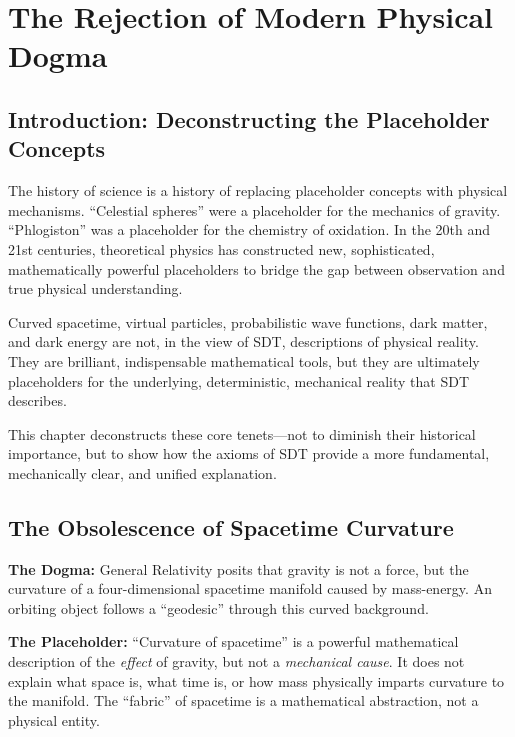 \chapter{The Rejection of Modern Physical Dogma}

\author{James Tyndall}

\section{Introduction: Deconstructing the Placeholder Concepts}

The history of science is a history of replacing placeholder concepts with physical mechanisms.  ``Celestial spheres'' were a placeholder for the mechanics of gravity.  ``Phlogiston'' was a placeholder for the chemistry of oxidation.  In the 20th and 21st centuries, theoretical physics has constructed new, sophisticated, mathematically powerful placeholders to bridge the gap between observation and true physical understanding.

Curved spacetime, virtual particles, probabilistic wave functions, dark matter, and dark energy are not, in the view of SDT, descriptions of physical reality.  They are brilliant, indispensable mathematical tools, but they are ultimately placeholders for the underlying, deterministic, mechanical reality that SDT describes.

This chapter deconstructs these core tenets---not to diminish their historical importance, but to show how the axioms of SDT provide a more fundamental, mechanically clear, and unified explanation.


\section{The Obsolescence of Spacetime Curvature}

\textbf{The Dogma:} General Relativity posits that gravity is not a force, but the curvature of a four-dimensional spacetime manifold caused by mass-energy.  An orbiting object follows a ``geodesic'' through this curved background.

\textbf{The Placeholder:} ``Curvature of spacetime'' is a powerful mathematical description of the \emph{effect} of gravity, but not a \emph{mechanical cause}.  It does not explain what space is, what time is, or how mass physically imparts curvature to the manifold.  The ``fabric'' of spacetime is a mathematical abstraction, not a physical entity.

